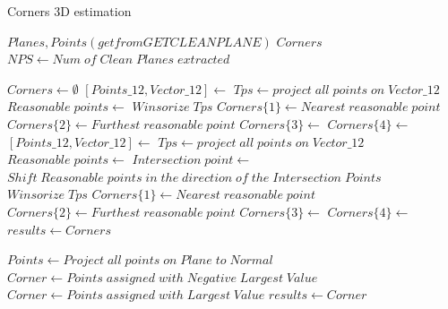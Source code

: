 \documentclass[10pt,a4paper]{article}
\begin{document}
\begin{algorithm}  
	\caption{Corners 3D estimation} 
	\label{alg:corner} 
	\begin{algorithmic}[1]  
		\Require $Planes, Points(get from GETCLEANPLANE)$ 
		\Ensure $Corners$
		\State $NPS \gets Num \;of \;Clean \;Planes \;extracted$
		
		
		\State $Corners \gets \emptyset$
		\State $[Points\_12, Vector\_12] \gets $
		\State $Tps \gets project \; all \; points \; on \;Vector\_12$
        \State $Reasonable \;points \gets$ 
        \State $Winsorize \;Tps $
        \State $Corners\{1\} \gets Nearest \;reasonable \;point$
        \State $Corners\{2\} \gets Furthest \; reasonable\; point$		
        \State $Corners\{3\} \gets$    
        \State $Corners\{4\} \gets$                
		\State $[Points\_12, Vector\_12] \gets $
		\State $Tps \gets project \; all \; points \; on \;Vector\_12$
		\State $Reasonable \;points \gets$  
		\State $Intersection \;point \gets $
		\State $Shift\; Reasonable \;points \; in \; the \;direction\;of\;the \; Intersection\;Points $
		\State $Winsorize \;Tps $		
        \State $Corners\{1\} \gets Nearest \;reasonable \;point$
        \State $Corners\{2\} \gets Furthest \; reasonable\; point$
        \State $Corners\{3\} \gets $
        \State $Corners\{4\} \gets $        
		\EndIf	
		\State $results\gets Corners$         
		\State {}  
		\EndFunction  
		
		
		\State  
		\State $Points \gets Project \;all \;points \;on \;Plane\; to \;Normal $  
		\State $Corner \gets Points \;assigned \;with \;Negative \;Largest \;Value$
		\Else
		\State $Corner \gets Points \;assigned \;with \;Largest \;Value$
		\EndIf
		\State $results\gets Corner$         
		\State {}  
		\EndFunction 
		

\end{algorithmic}
\end{algorithm}
\end{document}
